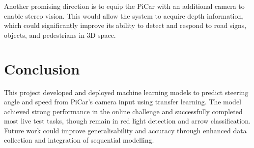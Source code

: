 \documentclass{article}
\begin{document}
Another promising direction is to equip the PiCar with an additional camera to enable stereo vision. This would allow the system to acquire depth information, which could significantly improve its ability to detect and respond to road signs, objects, and pedestrians in 3D space.

\section{Conclusion}
This project developed and deployed machine learning models to predict steering angle and speed from PiCar's camera input using transfer learning. The model achieved strong performance in the online challenge and successfully completed most live test tasks, though remain in red light detection and arrow classification. Future work could improve generalisability and accuracy through enhanced data collection and integration of sequential modelling.



\end{document}
